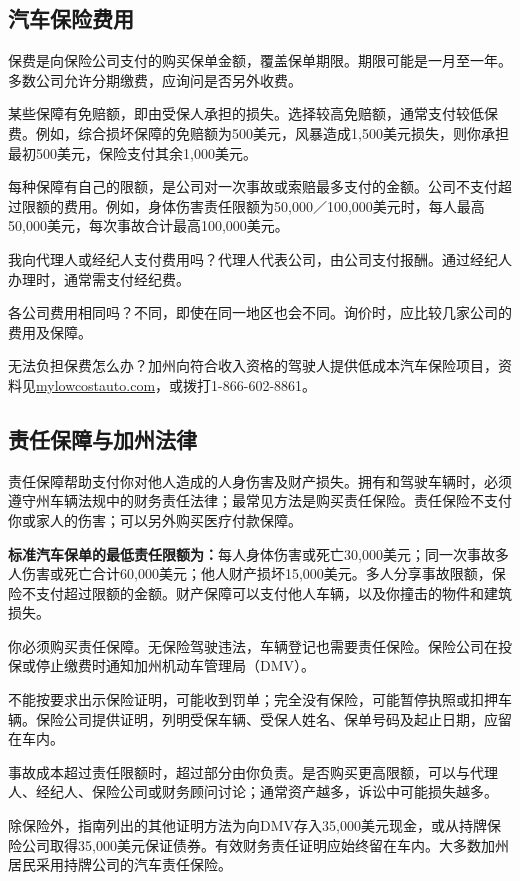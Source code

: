 \documentclass[UTF8,fontset=none,11pt,a4paper]{ctexart}
\begin{document}
\subsection*{汽车保险费用}
保费是向保险公司支付的购买保单金额，覆盖保单期限。期限可能是一月至一年。多数公司允许分期缴费，应询问是否另外收费。


某些保障有免赔额，即由受保人承担的损失。选择较高免赔额，通常支付较低保费。例如，综合损坏保障的免赔额为500美元，风暴造成1,500美元损失，则你承担最初500美元，保险支付其余1,000美元。


每种保障有自己的限额，是公司对一次事故或索赔最多支付的金额。公司不支付超过限额的费用。例如，身体伤害责任限额为50,000／100,000美元时，每人最高50,000美元，每次事故合计最高100,000美元。


我向代理人或经纪人支付费用吗？代理人代表公司，由公司支付报酬。通过经纪人办理时，通常需支付经纪费。


各公司费用相同吗？不同，即使在同一地区也会不同。询价时，应比较几家公司的费用及保障。


无法负担保费怎么办？加州向符合收入资格的驾驶人提供低成本汽车保险项目，资料见\url{mylowcostauto.com}，或拨打1-866-602-8861。


\subsection*{责任保障与加州法律}
责任保障帮助支付你对他人造成的人身伤害及财产损失。拥有和驾驶车辆时，必须遵守州车辆法规中的财务责任法律；最常见方法是购买责任保险。责任保险不支付你或家人的伤害；可以另外购买医疗付款保障。


\textbf{标准汽车保单的最低责任限额为：}每人身体伤害或死亡30,000美元；同一次事故多人伤害或死亡合计60,000美元；他人财产损坏15,000美元。多人分享事故限额，保险不支付超过限额的金额。财产保障可以支付他人车辆，以及你撞击的物件和建筑损失。


你必须购买责任保障。无保险驾驶违法，车辆登记也需要责任保险。保险公司在投保或停止缴费时通知加州机动车管理局（DMV）。


不能按要求出示保险证明，可能收到罚单；完全没有保险，可能暂停执照或扣押车辆。保险公司提供证明，列明受保车辆、受保人姓名、保单号码及起止日期，应留在车内。


事故成本超过责任限额时，超过部分由你负责。是否购买更高限额，可以与代理人、经纪人、保险公司或财务顾问讨论；通常资产越多，诉讼中可能损失越多。


除保险外，指南列出的其他证明方法为向DMV存入35,000美元现金，或从持牌保险公司取得35,000美元保证债券。有效财务责任证明应始终留在车内。大多数加州居民采用持牌公司的汽车责任保险。
\end{document}
